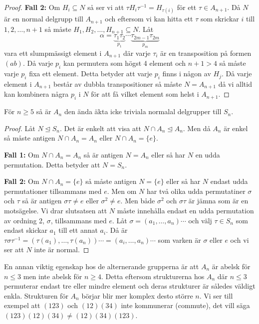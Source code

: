 \documentclass{article}
\theoremstyle{definition}
\begin{document}
\begin{proof}
  \textbf{Fall 2:} Om $H_i \subseteq N$ så ser vi att $\tau H_i \tau^{-1} = H_{\tau(i)}$ för ett $\tau \in A_{n+1}$. Då 
  $N$ är en normal delgrupp till $A_{n+1}$ och eftersom vi kan hitta ett $\tau$ som skrickar $i$ till $1, 2, \ldots, n+1$ så måste 
  $H_1, H_2, \ldots, H_{n+1} \subseteq N$. Låt
  \[\alpha =  \underbrace{\tau_1 \tau_2}_{p_1} \cdots \underbrace{\tau_{2m-1} \tau_{2m}}_{p_m} \]
  vara ett slumpmässigt element i $A_{n+1}$ där varje $\tau_i$ är en transposition på formen $(ab)$. Då varje $p_i$
  kan permutera som högst 4 element och $n + 1 > 4$ så måste varje $p_i$ fixa ett element. Detta betyder att varje $p_i$ finns i 
  någon av $H_j$. Då varje element i $A_{n+1}$ består av dubbla transpositioner så måste $N = A_{n+1}$ då vi alltid kan 
  kombinera några $p_i$ i $N$ för att få vilket element som helst i $A_{n+1}$.
\end{proof}

\hypertarget{sats3.2.5}{}
\begin{mytheo}{}{}
  För $n \geq 5$ så är $A_n$ den ända äkta icke triviala normalal delgrupper till $S_n$.
\end{mytheo}

\begin{proof}
  Låt $N \trianglelefteq S_n$. Det är enkelt att visa att $N \cap A_n \trianglelefteq A_n$. Men då $A_n$ är enkel så måste antigen 
  $N \cap A_n = A_n$ eller $N \cap A_n = \{e\}$.

  \textbf{Fall 1:} Om $N \cap A_n = A_n$ så är antigen $N = A_n$ eller så har $N$ en udda permutation. Detta betyder att $N = S_n$.

  \textbf{Fall 2:} Om $N \cap A_n = \{e\}$ så måste antigen $N = \{e\}$ eller så har $N$ endast udda permutationer tillsammans med $e$. 
  Men om $N$ har två olika udda permutatiner $\sigma$ och $\tau$ så är antigen $\sigma \tau \neq e$ eller $\sigma^2 \neq e$. 
  Men både $\sigma^2$ och $\sigma \tau$ är jämna som är en motsägelse. Vi drar slutsatsen att $N$ måste innehålla endast en udda permutation 
  av ordning 2, $\sigma$, tillsammans med $e$. Låt $\sigma = (a_1, \ldots, a_n) \cdots$ och välj $\tau \in S_n$ som endast skickar $a_1$ till ett annat $a_i$. 
  Då är $\tau \sigma \tau^{-1} = (\tau(a_1), \ldots, \tau(a_n)) \cdots = (a_i, \ldots, a_n) \cdots$ som varken är $\sigma$ eller $e$
  och vi ser att $N$ inte är normal.
\end{proof}

En annan viktig egenskap hos de alternerande grupperna är att $A_n$ är abelsk för $n \leq 3$ men inte abelsk för $n \geq 4$.
Detta eftersom strukturerna hos $A_n$ där $n \leq 3$ permuterar endast tre eller mindre element och deras strukturer 
är således väldigt enkla. Strukturen för $A_n$ börjar blir mer komplex desto större $n$. Vi ser till exempel att $(123)$ och $(12)(34)$
inte kommunerar (commute), det vill säga $(123)(12)(34) \neq (12)(34)(123)$.
\end{document}
